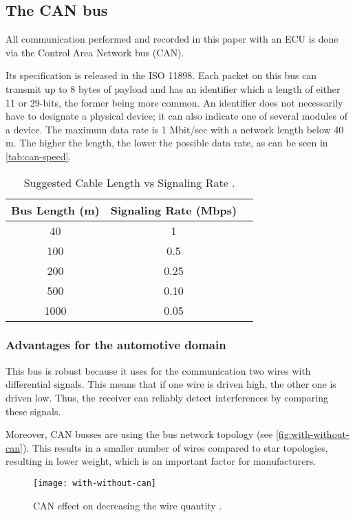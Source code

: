 \subsection{The CAN bus}

All communication performed and recorded in this paper with an ECU is done via the Control Area Network bus (CAN).

 Its specification is released in the ISO 11898. Each packet on this bus can transmit up to 8 bytes of payload and has an identifier which a length of either 11 or 29-bits, the former being more common. An identifier does not necessarily have to designate a physical device; it can also indicate one of several modules of a device.
 The maximum data rate is 1 Mbit/sec with a network length below 40 m. The higher the length, the lower the possible data rate, as can be seen in \autoref{tab:can-speed}.

\begin{table}[h]
    \centering
    \begin{tabular}{ccc}
    \hline
    \textbf{Bus Length (m)} & \textbf{Signaling Rate (Mbps)}\\
    \hline
    40 & 1 \\
    100 & 0.5 \\
    200 & 0.25 \\
    500 & 0.10 \\
    1000 & 0.05 \\
    \hline
\end{tabular}
\caption{Suggested Cable Length vs Signaling Rate \cite{slla270}.}
\label{tab:can-speed}
\end{table}

\subsubsection{Advantages for the automotive domain}

This bus is robust because it uses for the communication two wires  with differential signals. This means that if one wire is driven high, the other one is driven low. Thus, the receiver can reliably detect interferences by comparing these signals.

Moreover, CAN busses are using the bus network topology (see \autoref{fig:with-without-can}). This results in a smaller number of wires compared to star topologies, resulting in lower weight, which is an important factor for manufacturers.

\begin{figure}[h]
    \centering
    \texttt{[image: with-without-can]}
    \caption{CAN effect on decreasing the wire quantity \cite{Sharma2016}.}
    \label{fig:with-without-can}
\end{figure}


